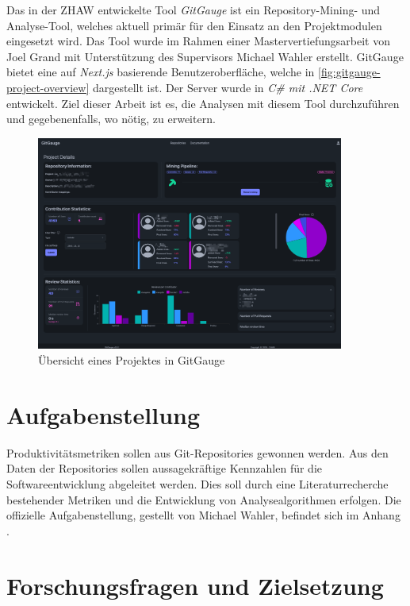 Das in der ZHAW entwickelte Tool \textit{GitGauge} ist ein Repository-Mining- und Analyse-Tool, welches aktuell primär für den Einsatz an den Projektmodulen eingesetzt wird. Das Tool wurde im Rahmen einer Mastervertiefungsarbeit von Joel Grand mit Unterstützung des Supervisors Michael Wahler erstellt. GitGauge bietet eine auf \textit{Next.js} basierende Benutzeroberfläche, welche in \autoref{fig:gitgauge-project-overview} dargestellt ist. Der Server wurde in \textit{C\# mit .NET Core } entwickelt. Ziel dieser Arbeit ist es, die Analysen mit diesem Tool durchzuführen und gegebenenfalls, wo nötig, zu erweitern. \parencite{grand_joel_wahler_michael_waspe_lara_stumpf_simon_repo_nodate}

\begin{figure}[htbp]
    \centering
    \includegraphics[width=0.9\textwidth]{Figures/giggauge-overview.png}
    \caption{Übersicht eines Projektes in GitGauge}
    \label{fig:gitgauge-project-overview}
\end{figure}

\newpage

\section{Aufgabenstellung}
Produktivitätsmetriken sollen aus Git-Repositories gewonnen werden. Aus den Daten der Repositories sollen aussagekräftige Kennzahlen für die Softwareentwicklung abgeleitet werden. Dies soll durch eine Literaturrecherche bestehender Metriken und die Entwicklung von Analysealgorithmen erfolgen.
Die offizielle Aufgabenstellung, gestellt von Michael Wahler, befindet sich im Anhang .
\newpage
\section{Forschungsfragen und Zielsetzung}
\label{sec:Zielsetzung}

